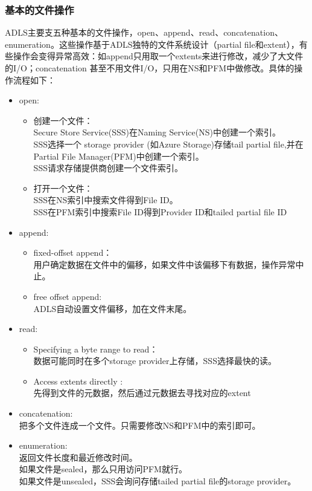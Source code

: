 \documentclass[11pt]{article}
\begin{document}
\subsubsection{基本的文件操作}
ADLS主要支五种基本的文件操作，open、append、read、concatenation、enumeration。这些操作基于ADLS独特的文件系统设计（partial file和extent），有些操作会变得异常高效：如append只用取一个extents来进行修改，减少了大文件的I/O；concatenation 甚至不用文件I/O，只用在NS和PFM中做修改。具体的操作流程如下：
\begin{itemize}
	\item open: 
	\begin{itemize}
		\item 创建一个文件：\\Secure Store Service(SSS)在Naming Service(NS)中创建一个索引。\\
SSS选择一个 storage provider (如Azure Storage)存储tail partial file,并在Partial File Manager(PFM)中创建一个索引。\\
SSS请求存储提供商创建一个文件索引。
		\item 打开一个文件：\\SSS在NS索引中搜索文件得到File ID。\\
SSS在PFM索引中搜索File ID得到Provider ID和tailed partial file ID
	\end{itemize}
	\item append:
	\begin{itemize}
		\item 	fixed-offset append：\\
用户确定数据在文件中的偏移，如果文件中该偏移下有数据，操作异常中止。
		\item free offset append:\\
ADLS自动设置文件偏移，加在文件末尾。
	\end{itemize}
	\item read:
	\begin{itemize}
		\item Specifying a byte range to read：\\
数据可能同时在多个storage provider上存储，SSS选择最快的读。
		\item 	Access extents directly :\\
先得到文件的元数据，然后通过元数据去寻找对应的extent

	\end{itemize}
	\item concatenation: \\
	把多个文件连成一个文件。只需要修改NS和PFM中的索引即可。
	\item enumeration: \\
	返回文件长度和最近修改时间。\\
如果文件是sealed，那么只用访问PFM就行。\\
如果文件是unsealed，SSS会询问存储tailed partial file的storage provider。\\	
\end{itemize}
\end{document}
